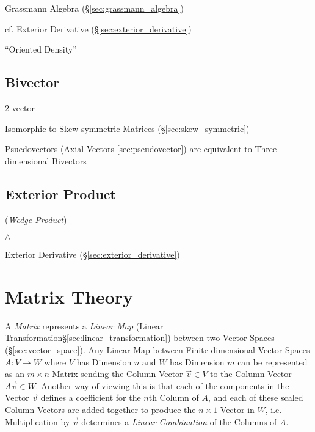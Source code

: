 Grassmann Algebra (\S\ref{sec:grassmann_algebra})

\fist cf. Exterior Derivative (\S\ref{sec:exterior_derivative}) %

``Oriented Density'' %



\subsection{Bivector}\label{sec:bivector}

$2$-vector

Isomorphic to Skew-symmetric Matrices (\S\ref{sec:skew_symmetric})

Psuedovectors (Axial Vectors \ref{sec:pseudovector}) are equivalent to
Three-dimensional Bivectors



\subsection{Exterior Product}\label{sec:exterior_product}

(\emph{Wedge Product})

$\wedge$

\fist Exterior Derivative (\S\ref{sec:exterior_derivative})



\section{Matrix Theory}\label{sec:matrix_theory}


A \emph{Matrix} represents a \emph{Linear Map} (Linear
Transformation\S\ref{sec:linear_transformation}) between two Vector Spaces
(\S\ref{sec:vector_space}). Any Linear Map between Finite-dimensional Vector
Spaces $A : V \rightarrow W$ where $V$ has Dimension $n$ and $W$ has Dimension
$m$ can be represented as an $m \times n$ Matrix sending the Column Vector
$\vec{v} \in V$ to the Column Vector $A\vec{v} \in W$. Another way of viewing
this is that each of the components in the Vector $\vec{v}$ defines a
coefficient for the $n$th Column of $A$, and each of these scaled Column
Vectors are added together to produce the $n \times 1$ Vector in $W$, i.e.
Multiplication by $\vec{v}$ determines a \emph{Linear Combination} of the
Columns of $A$.

